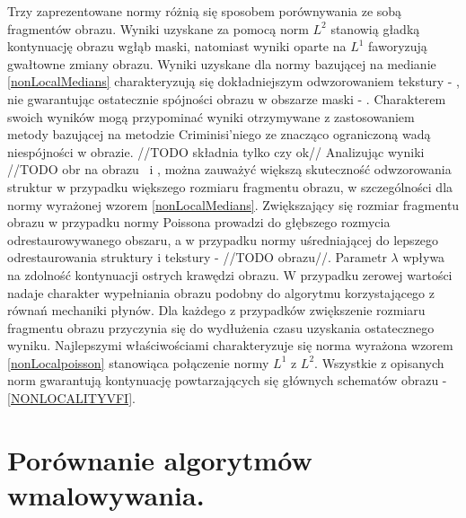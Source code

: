 \documentclass[12pt, twoside, openany]{report}
\theoremstyle{definition}
\begin{document}
Trzy zaprezentowane normy różnią się sposobem porównywania ze sobą fragmentów obrazu. Wyniki uzyskane za pomocą norm $L^2$ stanowią gładką kontynuację obrazu wgłąb maski, natomiast wyniki oparte na $L^1$ faworyzują gwałtowne zmiany obrazu. Wyniki uzyskane dla normy bazującej na medianie \eqref{nonLocalMedians} charakteryzują się dokładniejszym odwzorowaniem tekstury - \kotmyszm,  nie gwarantując ostatecznie spójności obrazu w obszarze maski - \ObrIVm. Charakterem swoich wyników mogą przypominać wyniki otrzymywane z zastosowaniem metody bazującej na metodzie Criminisi'niego ze znacząco ograniczoną wadą niespójności w obrazie. //TODO składnia tylko czy ok// Analizując wyniki //TODO obr na obrazu \maciekImu \ i \ObrXVIImu, można zauważyć większą skuteczność odwzorowania struktur w przypadku większego rozmiaru fragmentu obrazu, w szczególności dla normy wyrażonej wzorem \eqref{nonLocalMedians}. Zwiększający się  rozmiar fragmentu obrazu w przypadku normy Poissona prowadzi do głębszego rozmycia odrestaurowywanego obszaru, a w przypadku normy uśredniającej do lepszego odrestaurowania struktury i tekstury - \ObrIVmu //TODO obrazu//. Parametr $\lambda$ wpływa na zdolność kontynuacji ostrych krawędzi obrazu. W przypadku zerowej wartości nadaje charakter wypełniania obrazu podobny do algorytmu korzystającego z równań mechaniki płynów. Dla każdego z przypadków zwiększenie rozmiaru fragmentu obrazu przyczynia się do wydłużenia czasu uzyskania ostatecznego wyniku. Najlepszymi właściwościami charakteryzuje się norma wyrażona wzorem \eqref{nonLocalpoisson} stanowiąca połączenie normy $L^1$ z $L^2$. Wszystkie z opisanych norm gwarantują kontynuację powtarzających się głównych schematów obrazu - \autoref{NONLOCALITYVFI}.
\section{Porównanie algorytmów wmalowywania.}
\end{document}
